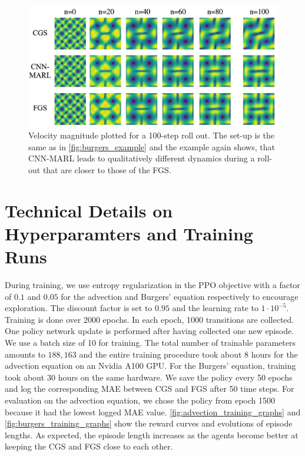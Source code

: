 \begin{figure}[ht]
\vskip 0.2in
\begin{center}
\centerline{\includegraphics[width=0.75\columnwidth]{illustrations/burgers/burgers_expl2.png}}
\caption{Velocity magnitude plotted for a 100-step roll out. The set-up is the same as in \cref{fig:burgers_example} and the example again shows, that CNN-MARL leads to qualitatively different dynamics during a roll-out that are closer to those of the FGS.}
\end{center}
\vskip -0.2in
\end{figure}

\newpage
\section{Technical Details on Hyperparamters and Training Runs} \label{sec:training_hyperparams}
During training, we use entropy regularization in the PPO objective with a factor of $0.1$ and $0.05$ for the advection and Burgers' equation respectively to encourage exploration. The discount factor is set to $0.95$ and the learning rate to $1\cdot 10^{-5}$. Training is done over 2000 epochs. In each epoch, 1000 transitions are collected. One policy network update is performed after having collected one new episode. We use a batch size of 10 for training. The total number of trainable parameters amounts to $188,163$ and the entire training procedure took about 8 hours for the advection equation on an Nvidia A100 GPU. For the Burgers' equation, training took about $30$ hours on the same hardware. We save the policy every 50 epochs and log the corresponding MAE between CGS and FGS after 50 time steps. For evaluation on the advection equation, we chose the policy from epoch 1500 because it had the lowest logged MAE value. \cref{fig:advection_training_graphs} and \cref{fig:burgers_training_graphs} show the reward curves and evolutions of episode lengths. As expected, the episode length increases as the agents become better at keeping the CGS and FGS close to each other. 

